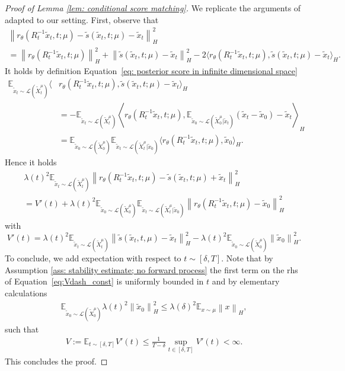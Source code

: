 \documentclass[10pt]{article} %
\def\Eqref#1{Equation~\ref{#1}}
\newcommand{\E}{\mathbb{E}}
\theoremstyle{plain}
\theoremstyle{definition}
\theoremstyle{remark}
\renewcommand{\L}{\mathscr{L}}
\newcommand{\norm}[1]{\left\|#1\right\|}
\begin{document}
\begin{proof}[Proof of Lemma \ref{lem: conditional score matching}]
We replicate the arguments of \cite{baldassari2024conditional} adapted to our setting. First, observe that 
\begin{multline*}
     \norm{r_\theta(R_t^{-1} \tilde x_t, t; \mu) - \tilde s(\tilde x_t, t; \mu) - \tilde x_t}_H^2  \\=  \norm{r_\theta(R_t^{-1} \tilde x_t, t; \mu)}_H^2 
    +  \norm{ \tilde s(\tilde x_t, t; \mu) - \tilde x_t}_H^2 - 2 \langle r_\theta(R_t^{-1} \tilde x_t, t; \mu) , \tilde s(\tilde x_t, t; \mu) - \tilde x_t \rangle_H.
\end{multline*}
    It holds by definition \Eqref{eq: posterior score in infinite dimensional space}
    \begin{align*}
        \E_{\tilde x_t \sim \L(\widetilde{X}_t^{\mu})} \langle & r_\theta(R_t^{-1}\tilde x_t, t; \mu) , \tilde s(\tilde x_t, t; \mu) - \tilde x_t \rangle_H  \\
        &= - \E_{\tilde x_t \sim \L(\widetilde{X}_t^{\mu})} \left\langle r_\theta(R_t^{-1}\tilde x_t, t; \mu) ,\E_{\tilde x_0 \sim \L(\widetilde{X}_0^{\mu} | \tilde x_t)} (\tilde x_t - \tilde x_0) - \tilde x_t \right\rangle_H \\
        & = \E_{\tilde x_0 \sim \L(\widetilde{X}_0^{\mu})} \E_{\tilde x_t \sim \L(\widetilde{X}_t^{\mu} | \tilde x_0 )} \langle r_\theta(R_t^{-1}\tilde x_t, t; \mu), \tilde x_0 \rangle_H.
    \end{align*}
    Hence it holds
    \begin{multline*}
        \lambda(t)^2 \E_{\tilde x_t \sim \L(\widetilde{X}_t^{\mu})} \norm{r_\theta(R_t^{-1} \tilde x_t, t; \mu) - \tilde s(\tilde x_t, t; \mu) + \tilde x_t}_H^2 \\
        =  V'(t) + \lambda(t)^2\E_{\tilde x_0 \sim \L(\widetilde{X}_0^{\mu})} \E_{\tilde x_t \sim \L(\widetilde{X}_t^{\mu} | \tilde x_0 )} \norm{r_\theta(R_t^{-1} \tilde x_t, t; \mu)- \tilde x_0 }_H^2
    \end{multline*}
    with
    \begin{equation}
        \label{eq:Vdash_const}
        V'(t) = \lambda(t)^2 \E_{\tilde x_t \sim \L(\widetilde{X}_t^{\mu})} \norm{\tilde s(\tilde x_t, t, \mu) - \tilde x_t}_H^2 - \lambda(t)^2 \E_{\tilde x_0 \sim \L(\widetilde{X}_0^{\mu})} \norm{\tilde x_0}_H^2.
    \end{equation}
    To conclude, we add expectation with respect to $t \sim [\delta, T]$.
    Note that by Assumption \ref{ass: stability estimate; no forward process} the first term on the rhs of \Eqref{eq:Vdash_const} is uniformly bounded in $t$ and by elementary calculations
    \begin{eqnarray*}
        \E_{\tilde x_0 \sim \L(\widetilde{X}_0^{\mu})} \lambda(t)^2 \norm{ \tilde x_0}_H^2 
         \le  \lambda(\delta)^2 \E_{x\sim \mu}\norm{x}_H,
    \end{eqnarray*}
    such that
    \begin{eqnarray*}
        V:=\E_{t \sim [\delta, T]} V'(t) \le \frac{1}{T-\delta}\sup_{t \in [\delta, T]} V'(t) < \infty.
    \end{eqnarray*}
    This concludes the proof.


\end{proof}
\end{document}
